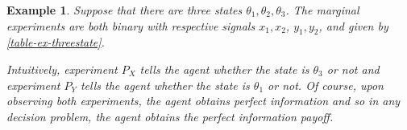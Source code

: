 \documentclass[11pt]{article}
\theoremstyle{plain}
\newtheorem{ex}{Example}
\theoremstyle{remark}
\begin{document}
\begin{ex}\label{ex:threestaets}
Suppose that there are three states $\theta_1, \theta_2, \theta_3$.  The marginal experiments are both binary with respective signals $x_1, x_2$, $y_1, y_2$, and given by \autoref{table-ex-threestate}.
\begin{table}[htp]
\centering
{}
\caption{}
\label{table-ex-threestate}
\end{table}


	Intuitively, experiment $P_X$ tells the agent whether the state is $\theta_3$ or not and experiment $P_Y$ tells the agent whether the state is $\theta_1$ or not. 
	Of course, upon observing both experiments, the agent obtains perfect information and so in any decision problem, the agent obtains the perfect information payoff.


\end{ex}
\end{document}
